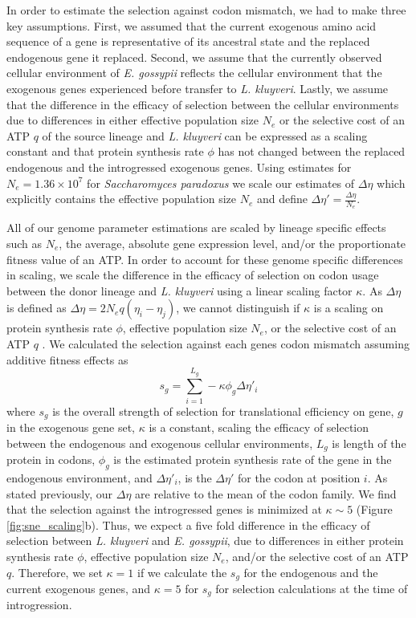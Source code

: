 \documentclass[doublespacing,linenumbers]{bmcart-modified}
\newcommand{\kluyveri}{\textit{L. kluyveri}\xspace}
\newcommand{\gossypii}{\textit{E. gossypii}\xspace}
\newcommand{\DE}{\ensuremath{{\Delta \eta}}\xspace}
\newcommand{\Ne}{\ensuremath{N_e}\xspace}
\begin{document}
In order to estimate the selection against codon mismatch, we had to make three key assumptions.
First, we assumed that the current exogenous amino acid sequence of a gene is representative of its ancestral state and the replaced endogenous gene it replaced.
Second, we assume that the currently observed cellular environment of \gossypii reflects the cellular environment that the exogenous genes experienced before transfer to \kluyveri.
Lastly, we assume that the difference in the efficacy of selection between the cellular environments due to differences in either effective population size $\Ne$ or the selective cost of an ATP $q$ of the source lineage and \kluyveri can be expressed as a scaling constant and that protein synthesis rate $\phi$ has not changed between the replaced endogenous and the introgressed exogenous genes.
Using estimates for $\Ne = 1.36\times10^7$ \citep{wagner2005} for \textit{Saccharomyces paradoxus} we scale our estimates of \DE which explicitly contains the effective population size $\Ne$ \citep{gilchrist2015} and define $\DE' = \frac{\DE}{\Ne}$.

All of our genome parameter estimations are scaled by lineage specific effects such as \Ne, the average, absolute gene expression level, and/or the proportionate fitness value of an ATP.
In order to account for these genome specific differences in scaling, we scale the difference in the efficacy of selection on codon usage between the donor lineage and \kluyveri using a linear scaling factor $\kappa$.
As \DE is defined as $\DE = 2\Ne q(\eta_i-\eta_j)$, we cannot distinguish if $\kappa$ is a scaling on protein synthesis rate $\phi$, effective population size $\Ne$, or the selective cost of an ATP $q$ \citep{gilchrist2007, gilchrist2015}.
We calculated the selection against each genes codon mismatch assuming additive fitness effects as 
\begin{equation}
s_g = \sum_{i=1}^{L_g} -\kappa \phi_g \DE'_i
\label{equ:sg}
\end{equation}
where $s_g$ is the overall strength of selection for translational efficiency on gene, $g$  in the exogenous gene set, $\kappa$ is a constant, scaling the efficacy of selection between the endogenous and exogenous cellular environments, $L_{g}$ is length of the protein in codons, $\phi_g$ is the estimated protein synthesis rate of the gene in the endogenous environment, and $\DE'_i$, is the $\DE'$ for the codon at position $i$.
As stated previously, our \DE are relative to the mean of the codon family.
We find that the selection against the introgressed genes is minimized at $\kappa \sim 5$ (Figure \ref{fig:sne_scaling}b).
Thus, we expect a five fold difference in the efficacy of selection between \kluyveri and \gossypii, due to differences in either protein synthesis rate $\phi$, effective population size $\Ne$, and/or the selective cost of an ATP $q$.
Therefore, we set $\kappa = 1$ if we calculate the $s_g$ for the endogenous and the current exogenous genes, and $\kappa = 5$ for $s_g$ for selection calculations at the time of introgression.
\end{document}
